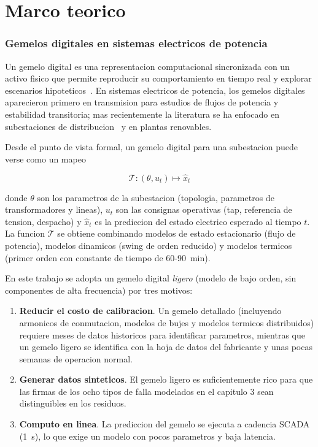 \chapter{Marco teorico}

\subsection{Gemelos digitales en sistemas electricos de potencia}

Un gemelo digital es una representacion computacional sincronizada con un
activo fisico que permite reproducir su comportamiento en tiempo real y
explorar escenarios hipoteticos~\citep{Tao2018,TwinPower2020}. En sistemas
electricos de potencia, los gemelos digitales aparecieron primero en
transmision para estudios de flujos de potencia y estabilidad transitoria;
mas recientemente la literatura se ha enfocado en subestaciones de
distribucion~\citep{DT-Substation-2022} y en plantas renovables.

Desde el punto de vista formal, un gemelo digital para una subestacion
puede verse como un mapeo

\[
\mathcal{T}: (\theta, u_t) \mapsto \hat{x}_t
\]

donde $\theta$ son los parametros de la subestacion (topologia, parametros
de transformadores y lineas), $u_t$ son las consignas operativas (tap,
referencia de tension, despacho) y $\hat{x}_t$ es la prediccion del estado
electrico esperado al tiempo $t$. La funcion $\mathcal{T}$ se obtiene
combinando modelos de estado estacionario (flujo de potencia), modelos
dinamicos (swing de orden reducido) y modelos termicos (primer orden con
constante de tiempo de 60-90~min).

En este trabajo se adopta un gemelo digital \emph{ligero} (modelo de bajo
orden, sin componentes de alta frecuencia) por tres motivos:

\begin{enumerate}[leftmargin=*,itemsep=2pt]
  \item \textbf{Reducir el costo de calibracion}. Un gemelo detallado
        (incluyendo armonicos de conmutacion, modelos de bujes y
        modelos termicos distribuidos) requiere meses de datos
        historicos para identificar parametros, mientras que un gemelo
        ligero se identifica con la hoja de datos del fabricante y
        unas pocas semanas de operacion normal.

  \item \textbf{Generar datos sinteticos}. El gemelo ligero es
        suficientemente rico para que las firmas de los ocho tipos de
        falla modelados en el capitulo 3 sean distinguibles en los
        residuos.

  \item \textbf{Computo en linea}. La prediccion del gemelo se ejecuta
        a cadencia SCADA (1~s), lo que exige un modelo con pocos
        parametros y baja latencia.
\end{enumerate}

